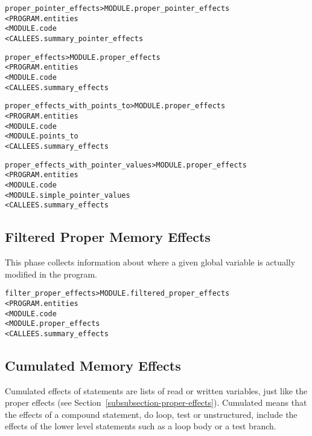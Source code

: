 \documentclass[a4paper]{report}
\newenvironment{PipsMake}{\begin{alltt}}{\end{alltt}}
\newenvironment{PipsPass}[1]{\label{pass:#1}}{}
\begin{document}
\begin{PipsMake}
proper_pointer_effects                  > MODULE.proper_pointer_effects
        < PROGRAM.entities
        < MODULE.code
        < CALLEES.summary_pointer_effects
\end{PipsMake}

\begin{PipsMake}
proper_effects                  > MODULE.proper_effects
        < PROGRAM.entities
        < MODULE.code
        < CALLEES.summary_effects
\end{PipsMake}

\begin{PipsMake}
proper_effects_with_points_to > MODULE.proper_effects
        < PROGRAM.entities
        < MODULE.code
        < MODULE.points_to
        < CALLEES.summary_effects
\end{PipsMake}

\begin{PipsMake}
proper_effects_with_pointer_values > MODULE.proper_effects
        < PROGRAM.entities
        < MODULE.code
        < MODULE.simple_pointer_values
        < CALLEES.summary_effects
\end{PipsMake}


\subsection{Filtered Proper Memory Effects}
\label{subsubsection-filtered-proper-effects}

\begin{PipsPass}{filter_proper_effects}
This phase collects information about where a given global variable is
actually modified in the program.
\end{PipsPass}


\begin{PipsMake}
filter_proper_effects         > MODULE.filtered_proper_effects
        < PROGRAM.entities
        < MODULE.code
        < MODULE.proper_effects
        < CALLEES.summary_effects
\end{PipsMake}


\subsection{Cumulated Memory Effects}
\label{subsubsection-cumulated-effects}

\begin{PipsPass}{cumulated_effects}
Cumulated effects of statements are lists of read or written
variables, just like the proper effects (see Section~\ref{subsubsection-proper-effects}). Cumulated means that the effects of a compound statement, do
loop, test or unstructured, include the effects of the lower level
statements such as a loop body or a test branch.
\end{PipsPass}
\end{document}
